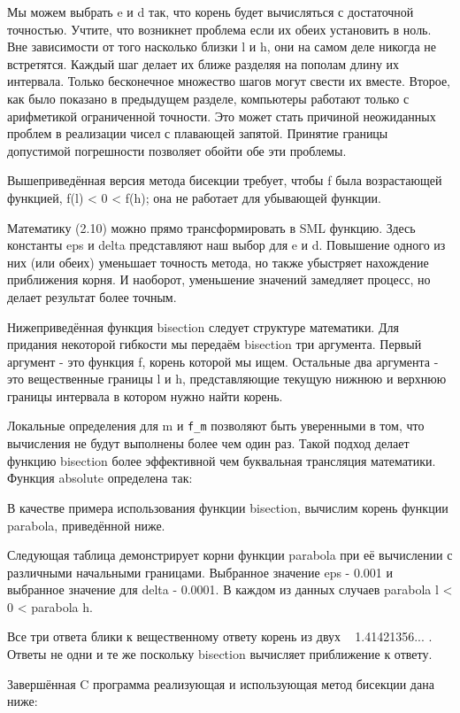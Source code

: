 Мы можем выбрать e и d так, что корень будет вычисляться с достаточной точностью. Учтите, что возникнет проблема если их обеих установить в ноль. Вне зависимости от того насколько близки l и h, они на самом деле никогда не встретятся. Каждый шаг делает их ближе разделяя на пополам длину их интервала. Только бесконечное множество шагов могут свести их вместе. Второе, как было показано в предыдущем разделе, компьютеры работают только с арифметикой ограниченной точности. Это может стать причиной неожиданных проблем в реализации чисел с плавающей запятой. Принятие границы допустимой погрешности позволяет обойти обе эти проблемы.

Вышеприведённая версия метода бисекции требует, чтобы f была возрастающей функцией, f(l) < 0 < f(h); она не работает для убывающей функции.

Математику (2.10) можно прямо трансформировать в SML функцию. Здесь константы eps и delta представляют наш выбор для e и d. Повышение одного из них (или обеих) уменьшает точность метода, но также убыстряет нахождение приближения корня. И наоборот, уменьшение значений замедляет процесс, но делает результат более точным.

Нижеприведённая функция bisection следует структуре математики. Для придания некоторой гибкости мы передаём bisection три аргумента. Первый аргумент - это функция f, корень которой мы ищем. Остальные два аргумента - это вещественные границы l и h, представляющие текущую нижнюю и верхнюю границы интервала в котором нужно найти корень.

Локальные определения для m и \lstinline|f_m| позволяют быть уверенными в том, что вычисления не будут выполнены более чем один раз. Такой подход делает функцию bisection более эффективной чем буквальная трансляция математики. Функция absolute определена так:

В качестве примера использования функции bisection, вычислим корень функции parabola, приведённой ниже.

Следующая таблица демонстрирует корни функции parabola при её вычислении с различными начальными границами. Выбранное значение eps - 0.001 и выбранное значение для delta - 0.0001. В каждом из данных случаев parabola l < 0 < parabola h.

Все три ответа блики к вещественному ответу корень из двух ~ 1.41421356... . Ответы не одни и те же поскольку bisection вычисляет приближение к ответу.

Завершённая C программа реализующая и использующая метод бисекции дана ниже:


